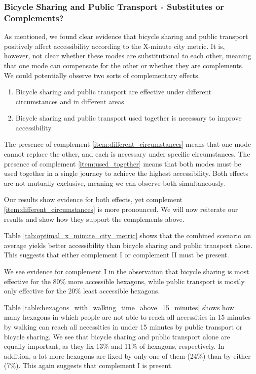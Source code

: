 \subsubsection{Bicycle Sharing and Public Transport - Substitutes or Complements?}
As mentioned, we found clear evidence that bicycle sharing and public transport positively affect accessibility according to the X-minute city metric.
It is, however, not clear whether these modes are substitutional to each other, meaning that one mode can compensate for the other or whether they are complements.
We could potentially observe two sorts of complementary effects.
\begin{enumerate}
  \renewcommand{\labelenumi}{Complement \theenumi.}
  \item Bicycle sharing and public transport are effective under different circumstances and in different areas \label{item:different_circumstances}
  \item Bicycle sharing and public transport used together is necessary to improve accessibility \label{item:used_together}
\end{enumerate}
The presence of complement \ref{item:different_circumstances} means that one mode cannot replace the other, and each is necessary under specific circumstances.
The presence of complement \ref{item:used_together} means that both modes must be used together in a single journey to achieve the highest accessibility.
Both effects are not mutually exclusive, meaning we can observe both simultaneously.

Our results show evidence for both effects, yet complement \ref{item:different_circumstances} is more pronounced.
We will now reiterate our results and show how they support the complements above.

Table \ref{tab:optimal_x_minute_city_metric} shows that the combined scenario on average yields better accessibility than bicycle sharing and public transport alone.
This suggests that either complement I or complement II must be present.

We see evidence for complement I in the observation that bicycle sharing is most effective for the 80\% more accessible hexagons, while public transport is mostly only effective for the 20\% least accessible hexagons.

Table \ref{table:hexagons_with_walking_time_above_15_minutes} shows how many hexagons in which people are not able to reach all necessities in 15 minutes by walking can reach all necessities in under 15 minutes by public transport or bicycle sharing.
We see that bicycle sharing and public transport alone are equally important, as they fix 13\% and 11\% of hexagons, respectively.
In addition, a lot more hexagons are fixed by only one of them (24\%) than by either (7\%).
This again suggests that complement I is present.


